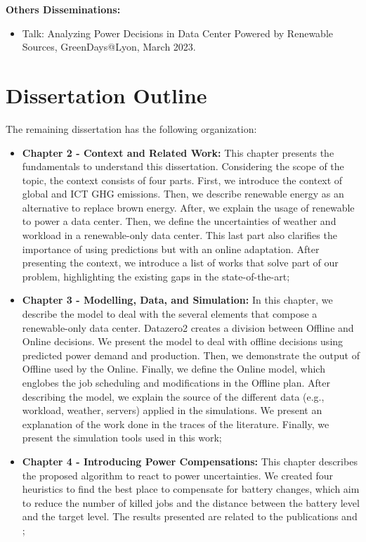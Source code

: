 \textbf{Others Disseminations:}
\begin{itemize}
    \item Talk: Analyzing Power Decisions in Data Center
    Powered by Renewable Sources, GreenDays@Lyon, March 2023.
\end{itemize}

\section{Dissertation Outline}
The remaining dissertation has the following organization:
\begin{itemize}
    \item[] \textbf{Chapter 2 - Context and Related Work:} This chapter presents the fundamentals to understand this dissertation. Considering the scope of the topic, the context consists of four parts. First, we introduce the context of global and ICT GHG emissions. Then, we describe renewable energy as an alternative to replace brown energy. After, we explain the usage of renewable to power a data center. Then, we define the uncertainties of weather and workload in a renewable-only data center. This last part also clarifies the importance of using predictions but with an online adaptation. After presenting the context, we introduce a list of works that solve part of our problem, highlighting the existing gaps in the state-of-the-art;
    \item[] \textbf{Chapter 3 - Modelling, Data, and Simulation:} In this chapter, we describe the model to deal with the several elements that compose a renewable-only data center. Datazero2 creates a division between Offline and Online decisions. We present the model to deal with offline decisions using predicted power demand and production. Then, we demonstrate the output of Offline used by the Online. Finally, we define the Online model, which englobes the job scheduling and modifications in the Offline plan. After describing the model, we explain the source of the different data (e.g., workload, weather, servers) applied in the simulations. We present an explanation of the work done in the traces of the literature. Finally, we present the simulation tools used in this work;
    \item[] \textbf{Chapter 4 - Introducing Power Compensations:} This chapter describes the proposed algorithm to react to power uncertainties. We created four heuristics to find the best place to compensate for battery changes, which aim to reduce the number of killed jobs and the distance between the battery level and the target level. The results presented are related to the publications \cite{de2022mixing} and \cite{de2022analyzing};

\end{itemize}

